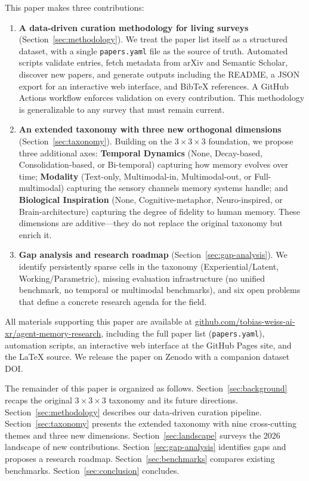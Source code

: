 This paper makes three contributions:

\begin{enumerate}
  \item \textbf{A data-driven curation methodology for living surveys} (Section~\ref{sec:methodology}). We treat the paper list itself as a structured dataset, with a single \texttt{papers.yaml} file as the source of truth. Automated scripts validate entries, fetch metadata from arXiv and Semantic Scholar, discover new papers, and generate outputs including the README, a JSON export for an interactive web interface, and BibTeX references. A GitHub Actions workflow enforces validation on every contribution. This methodology is generalizable to any survey that must remain current.
  \item \textbf{An extended taxonomy with three new orthogonal dimensions} (Section~\ref{sec:taxonomy}). Building on the $3\times 3 \times 3$ foundation, we propose three additional axes: \textbf{Temporal Dynamics} (None, Decay-based, Consolidation-based, or Bi-temporal) capturing how memory evolves over time; \textbf{Modality} (Text-only, Multimodal-in, Multimodal-out, or Full-multimodal) capturing the sensory channels memory systems handle; and \textbf{Biological Inspiration} (None, Cognitive-metaphor, Neuro-inspired, or Brain-architecture) capturing the degree of fidelity to human memory. These dimensions are additive---they do not replace the original taxonomy but enrich it.
  \item \textbf{Gap analysis and research roadmap} (Section~\ref{sec:gap-analysis}). We identify persistently sparse cells in the taxonomy (Experiential/Latent, Working/Parametric), missing evaluation infrastructure (no unified benchmark, no temporal or multimodal benchmarks), and six open problems that define a concrete research agenda for the field.
\end{enumerate}

All materials supporting this paper are available at \url{github.com/tobias-weiss-ai-xr/agent-memory-research}, including the full paper list (\texttt{papers.yaml}), automation scripts, an interactive web interface at the GitHub Pages site, and the LaTeX source. We release the paper on Zenodo with a companion dataset DOI.

The remainder of this paper is organized as follows. Section~\ref{sec:background} recaps the original $3\times 3 \times 3$ taxonomy and its future directions. Section~\ref{sec:methodology} describes our data-driven curation pipeline. Section~\ref{sec:taxonomy} presents the extended taxonomy with nine cross-cutting themes and three new dimensions. Section~\ref{sec:landscape} surveys the 2026 landscape of new contributions. Section~\ref{sec:gap-analysis} identifies gaps and proposes a research roadmap. Section~\ref{sec:benchmarks} compares existing benchmarks. Section~\ref{sec:conclusion} concludes.
